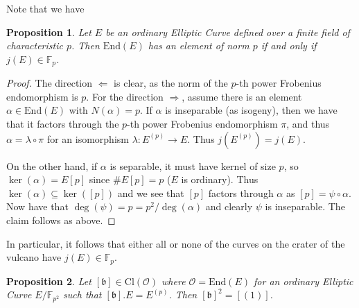 \documentclass{scrartcl}
\newcommand{\F}{\mathbb{F}}
\newcommand{\End}{\mathrm{End}}
\newcommand{\Cl}{\mathrm{Cl}}
\renewcommand{\b}{\mathfrak{b}}
\renewcommand{\O}{\mathcal{O}}
\newtheorem{prop}{Proposition}[section]
\theoremstyle{definition}
\begin{document}
Note that we have
\begin{prop}
    Let $E$ be an ordinary Elliptic Curve defined over a finite field of characteristic $p$.
    Then $\End(E)$ has an element of norm $p$ if and only if $j(E) \in \F_p$.
\end{prop}
\begin{proof}
    The direction $\Leftarrow$ is clear, as the norm of the $p$-th power Frobenius endomorphism is $p$.
    For the direction $\Rightarrow$, assume there is an element $\alpha \in \End(E)$ with $N(\alpha) = p$.
    If $\alpha$ is inseparable (as isogeny), then we have that it factors through the $p$-th power Frobenius endomorphism $\pi$, and thus $\alpha = \lambda \circ \pi$ for an isomorphism $\lambda: E^{(p)} \to E$.
    Thus $j(E^{(p)}) = j(E)$.

    On the other hand, if $\alpha$ is separable, it must have kernel of size $p$, so $\ker(\alpha) = E[p]$ since $\#E[p] = p$ ($E$ is ordinary).
    Thus $\ker(\alpha) \subseteq \ker([p])$ and we see that $[p]$ factors through $\alpha$ as $[p] = \psi \circ \alpha$.
    Now have that $\deg(\psi) = p = p^2/\deg(\alpha)$ and clearly $\psi$ is inseparable.
    The claim follows as above.
\end{proof}
In particular, it follows that either all or none of the curves on the crater of the vulcano have $j(E) \in \F_p$. 
\begin{prop}
    Let $[\b] \in \Cl(\O)$ where $\O = \End(E)$ for an ordinary Elliptic Curve $E/\F_{p^2}$ such that $[\b].E = E^{(p)}$.
    Then $[\b]^2 = [(1)]$.
\end{prop}
\end{document}

